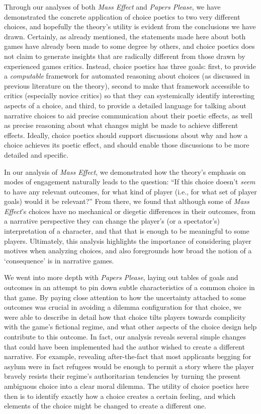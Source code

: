 \documentclass[arts,article,submit,moreauthors,pdftex,10pt,a4paper]{Definitions/mdpi}
\begin{document}
Through our analyses of both \emph{Mass Effect} and \emph{Papers Please}, we have demonstrated the concrete application of choice poetics to two very different choices, and hopefully the theory's utility is evident from the conclusions we have drawn.
%
Certainly, as already mentioned, the statements made here about both games have already been made to some degree by others, and choice poetics does not claim to generate insights that are radically different from those drawn by experienced games critics.
%
Instead, choice poetics has three goals: first, to provide a \emph{computable} framework for automated reasoning about choices (as discussed in previous literature on the theory), second to make that framework accessible to critics (especially novice critics) so that they can systemically identify interesting aspects of a choice, and third, to provide a detailed language for talking about narrative choices to aid precise communication about their poetic effects, as well as precise reasoning about what changes might be made to achieve different effects.
%
Ideally, choice poetics should support discussions about why and how a choice achieves its poetic effect, and should enable those discussions to be more detailed and specific.


In our analysis of \emph{Mass Effect}, we demonstrated how the theory's emphasis on modes of engagement naturally leads to the question: ``If this choice doesn't \emph{seem} to have any relevant outcomes, for what kind of player (i.e., for what set of player goals) would it be relevant?''
%
From there, we found that although some of \emph{Mass Effect}'s choices have no mechanical or diegetic differences in their outcomes, from a narrative perspective they can change the player's (or a spectator's) interpretation of a character, and that that is enough to be meaningful to some players.
%
Ultimately, this analysis highlights the importance of considering player motives when analyzing choices, and also foregrounds how broad the notion of a `consequence' is in narrative games.


We went into more depth with \emph{Papers Please}, laying out tables of goals and outcomes in an attempt to pin down subtle characteristics of a common choice in that game.
%
By paying close attention to how the uncertainty attached to some outcomes was crucial in avoiding a dilemma configuration for that choice, we were able to describe in detail how that choice tilts players towards complicity with the game's fictional regime, and what other aspects of the choice design help contribute to this outcome.
%
In fact, our analysis reveals several simple changes that could have been implemented had the author wished to create a different narrative.
%
For example, revealing after-the-fact that most applicants begging for asylum were in fact refugees would be enough to permit a story where the player bravely resists their regime's authoritarian tendencies by turning the present ambiguous choice into a clear moral dilemma.
%
The utility of choice poetics here then is to identify exactly how a choice creates a certain feeling, and which elements of the choice might be changed to create a different one.
\end{document}
